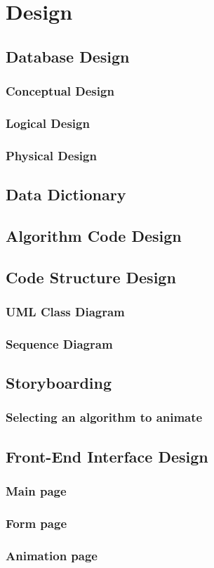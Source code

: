 \chapter{Design}

\section{Database Design}
\subsection{Conceptual Design}
\subsection{Logical Design}
\subsection{Physical Design}

\section{Data Dictionary}

\section{Algorithm Code Design}

\section{Code Structure Design}
\subsection{UML Class Diagram}
\subsection{Sequence Diagram}

\section{Storyboarding}
\subsection{Selecting an algorithm to animate}

\section{Front-End Interface Design}
\subsection{Main page}
\subsection{Form page}
\subsection{Animation page}



